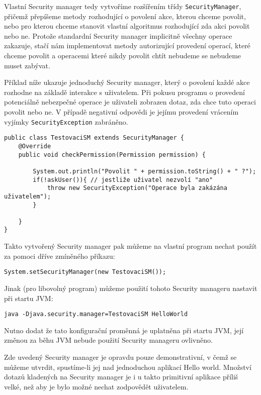 Vlastní Security manager tedy vytvoříme rozšířením třídy {\tt SecurityManager}, přičemž přepíšeme metody rozhodující o povolení akce, kterou chceme povolit, nebo pro kterou chceme stanovit vlastní algoritmus rozhodující zda akci povolit nebo ne.
Protože standardní Security manager implicitně všechny operace zakazuje, stačí nám implementovat metody autorizující provedení operací, které chceme povolit a operacemi které nikdy povolit chtít nebudeme se nebudeme muset zabývat.

Příklad níže ukazuje jednoduchý Security manager, který o povolení každé akce rozhodne na základě interakce s uživatelem. Při pokusu programu o provedení potenciálně nebezpečné operace je uživateli zobrazen dotaz, zda chce tuto operaci povolit nebo ne. V případě negativní odpovědi je jejímu provedení vrácením vyjímky {\tt SecurityException} zabráněno.

\begin{verbatim}
public class TestovaciSM extends SecurityManager {
    @Override
    public void checkPermission(Permission permission) {
        
        System.out.println("Povolit " + permission.toString() + " ?");
        if(!askUser()){ // jestliže uživatel nezvolí "ano"
            throw new SecurityException("Operace byla zakázána uživatelem");
        }
        
    }
}
\end{verbatim}

Takto vytvořený Security manager pak můžeme na vlastní program nechat použít za pomoci dříve zmíněného příkazu:

\begin{verbatim}
System.setSecurityManager(new TestovaciSM());
\end{verbatim}

Jinak (pro libovolný program) můžeme použití tohoto Security manageru nastavit při startu JVM:

\begin{verbatim}
java -Djava.security.manager=TestovaciSM HelloWorld
\end{verbatim}

Nutno dodat že tato konfigurační proměnná je uplatněna při startu JVM, její změnou za běhu JVM nebude použití Security manageru ovlivněno.

Zde uvedený Security manager je opravdu pouze demonstrativní, v čemž se můžeme utvrdit, spustíme-li jej nad jednoduchou aplikací Hello world. Množství dotazů kladených na Security manager je i u takto primitivní aplikace příliš velké, než aby je bylo možné nechat zodpovědět uživatelem.

